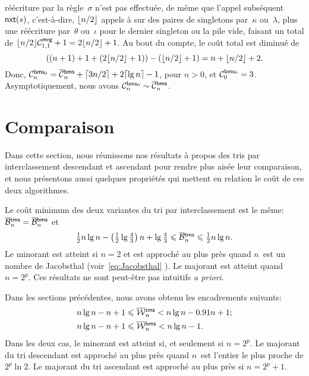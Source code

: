 réécriture par la règle~\(\sigma\) n'est pas effectuée, de même que
l'appel subséquent \(\fun{nxt}(s)\),
c'est-à-dire, \(\floor{n/2}\) appels à
 sur des paires de singletons
par~\(\kappa\) ou~\(\lambda\), plus une réécriture par~\(\theta\)
ou~\(\iota\) pour le dernier singleton ou la pile vide, faisant un
total de \(\floor{n/2}\C{\fun{mrg}}{1,1} + 1 = 2\floor{n/2} + 1\). Au
bout du compte, le coût total est diminué de
\begin{equation*}
  ((n+1) + 1 + (2\floor{n/2}+1)) - (\floor{n/2}+1) = n + \floor{n/2} +
  2.
\end{equation*}
Donc, \(\C{\fun{bms}_0}{n} = \OC{\fun{bms}}{n} + \ceiling{3n/2} +
2\ceiling{\lg n} - 1\), pour \(n>0\), et \(\C{\fun{bms}_0}{0} =
3\). Asymptotiquement, nous avons \(\C{\fun{bms}_0}{n} \sim
\OC{\fun{bms}}{n}\).

\section{Comparaison}

Dans cette section, nous réunissons nos résultats à propos des tris
par interclassement descendant et ascendant pour rendre plus aisée
leur comparaison, et nous présentons aussi quelques propriétés qui
mettent en relation le coût de ces deux algorithmes.


Le coût minimum des deux variantes du tri par interclassement est le
même: \(\OB{\fun{tms}}{n} = \OB{\fun{bms}}{n}\) et
\begin{equation*}
\tfrac{1}{2}n\lg n - \left(\tfrac{1}{2}\lg\tfrac{4}{3}\right)n + \lg\tfrac{4}{3}
\leqslant \OB{\fun{tms}}{n} \leqslant
\tfrac{1}{2}n\lg n.
\end{equation*}
Le minorant est atteint si \(n=2\) et est approché au plus près quand
\(n\)~est un nombre de Jacobsthal
(voir~\eqref{eq:Jacobsthal} ). Le majorant est
atteint quand \(n=2^p\). Ces résultats ne sont peut-être pas
intuitifs \emph{a priori}.


Dans les sections précédentes, nous avons obtenu les encadrements
suivants:
\begin{align*}
n\lg n - n + 1 &\leqslant \OW{\fun{tms}}{n} <
n\lg n - 0.91 n + 1;\\
n\lg n - n + 1 &\leqslant \OW{\fun{bms}}{n} < n\lg n - 1.
\end{align*}
Dans les deux cas, le minorant est atteint si, et seulement si
\(n=2^p\). Le majorant du tri descendant est approché au plus près
quand \(n\)~est l'entier le plus proche de \(2^p\ln 2\). Le majorant
du tri ascendant est approché au plus près si \(n=2^p+1\).

